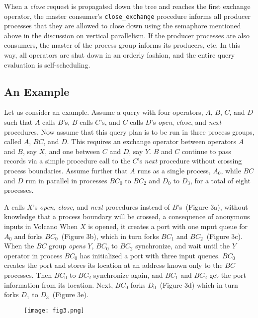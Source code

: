 \documentclass[a4paper,12pt,notitlepage,twoside,openright]{article}
\begin{document}
When a \emph{close} request is propagated down the tree
and reaches the first exchange operator, the master
consumer's \texttt{close\_exchange} procedure informs all producer
processes that they are allowed to close down using the
semaphore mentioned above in the discussion on vertical
parallelism. If the producer processes are also consumers,
the master of the process group informs its producers, etc.
In this way, all operators are shut down in an orderly
fashion, and the entire query evaluation is self-scheduling.

\subsection{An Example}

Let us consider an example. Assume a query with
four operators, \(A\), \(B\), \(C\), and \(D\) such that \(A\) calls \(B\)'s, \(B\)
calls \(C\)'s, and \(C\) calls \(D\)'s \emph{open}, \emph{close}, and \emph{next} procedures.
Now assume that this query plan is to be run in
three process groups, called \(A\), \(BC\), and \(D\). This requires
an exchange operator between operators \(A\) and \(B\), say \(X\),
and one between \(C\) and \(D\), say \(Y\). \(B\) and \(C\) continue to
pass records via a simple procedure call to the \(C\)'s \emph{next}
procedure without crossing process boundaries. Assume
further that \(A\) runs as a single process, \(A_0\), while \(BC\) and
\(D\) run in parallel in processes \(BC_0\) to \(BC_2\) and \(D_0\) to \(D_3\),
for a total of eight processes.

A calls $X$'s \emph{open}, \emph{close}, and \emph{next} procedures instead
of $B$'s~(Figure 3a), without knowledge that a process boundary
will be crossed, a consequence of anonymous inputs in
Volcano When $X$ is opened, it creates a port with one
mput queue for $A_0$ and forks $BC_0$~(Figure 3b), which in
turn forks $BC_1$ and $BC_2$~(Figure 3c). When the $BC$ group
\emph{opens} $Y$, $BC_0$ to $BC_2$ synchronize, and wait until the $Y$
operator in process $BC_0$ has initialized a port with three
input queues. $BC_0$ creates the port and stores its location
at an address known only to the $BC$ processes. Then $BC_0$
to $BC_2$ synchronize again, and $BC_1$ and $BC_2$ get the port
information from its location. Next, $BC_0$ forks $D_0$~(Figure 3d)
which in turn forks $D_1$ to $D_3$~(Figure 3e).

\begin{figure}
  \centering
  \texttt{[image: fig3.png]}
\end{figure}
\end{document}
